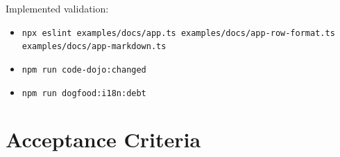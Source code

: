 Implemented validation:

\begin{itemize}
\tightlist
\item
  \texttt{n\allowbreak{}p\allowbreak{}x\allowbreak{} \allowbreak{}e\allowbreak{}s\allowbreak{}l\allowbreak{}i\allowbreak{}n\allowbreak{}t\allowbreak{} \allowbreak{}e\allowbreak{}x\allowbreak{}a\allowbreak{}m\allowbreak{}p\allowbreak{}l\allowbreak{}e\allowbreak{}s\allowbreak{}/\allowbreak{}d\allowbreak{}o\allowbreak{}c\allowbreak{}s\allowbreak{}/\allowbreak{}a\allowbreak{}p\allowbreak{}p\allowbreak{}.\allowbreak{}t\allowbreak{}s\allowbreak{} \allowbreak{}e\allowbreak{}x\allowbreak{}a\allowbreak{}m\allowbreak{}p\allowbreak{}l\allowbreak{}e\allowbreak{}s\allowbreak{}/\allowbreak{}d\allowbreak{}o\allowbreak{}c\allowbreak{}s\allowbreak{}/\allowbreak{}a\allowbreak{}p\allowbreak{}p\allowbreak{}-\allowbreak{}r\allowbreak{}o\allowbreak{}w\allowbreak{}-\allowbreak{}f\allowbreak{}o\allowbreak{}r\allowbreak{}m\allowbreak{}a\allowbreak{}t\allowbreak{}.\allowbreak{}t\allowbreak{}s\allowbreak{} \allowbreak{}e\allowbreak{}x\allowbreak{}a\allowbreak{}m\allowbreak{}p\allowbreak{}l\allowbreak{}e\allowbreak{}s\allowbreak{}/\allowbreak{}d\allowbreak{}o\allowbreak{}c\allowbreak{}s\allowbreak{}/\allowbreak{}a\allowbreak{}p\allowbreak{}p\allowbreak{}-\allowbreak{}m\allowbreak{}a\allowbreak{}r\allowbreak{}k\allowbreak{}d\allowbreak{}o\allowbreak{}w\allowbreak{}n\allowbreak{}.\allowbreak{}t\allowbreak{}s}
\item
  \texttt{n\allowbreak{}p\allowbreak{}m\allowbreak{} \allowbreak{}r\allowbreak{}u\allowbreak{}n\allowbreak{} \allowbreak{}c\allowbreak{}o\allowbreak{}d\allowbreak{}e\allowbreak{}-\allowbreak{}d\allowbreak{}o\allowbreak{}j\allowbreak{}o\allowbreak{}:\allowbreak{}c\allowbreak{}h\allowbreak{}a\allowbreak{}n\allowbreak{}g\allowbreak{}e\allowbreak{}d}
\item
  \texttt{n\allowbreak{}p\allowbreak{}m\allowbreak{} \allowbreak{}r\allowbreak{}u\allowbreak{}n\allowbreak{} \allowbreak{}d\allowbreak{}o\allowbreak{}g\allowbreak{}f\allowbreak{}o\allowbreak{}o\allowbreak{}d\allowbreak{}:\allowbreak{}i\allowbreak{}1\allowbreak{}8\allowbreak{}n\allowbreak{}:\allowbreak{}d\allowbreak{}e\allowbreak{}b\allowbreak{}t}
\end{itemize}

\section{Acceptance Criteria}\label{record-198-acceptance-criteria}

